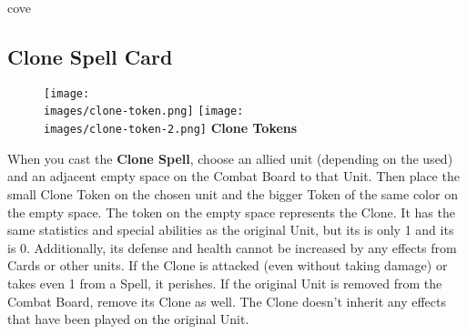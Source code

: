 \begin{multicols}{2}
\begin{expansion}{cove}
    \subsection*{Clone Spell Card}
    \setlength\intextsep{0pt}
    \setlength\columnsep{1em}
    \begin{wrapfigure}{r}{0.2\linewidth}
        \texttt{[image: \\images/clone-token.png]}\vspace*{1em}
        \texttt{[image: \\images/clone-token-2.png]}
        \centering\textbf{\scriptsize\color{darkcandyapplered}Clone \mbox{Tokens}\\}
    \end{wrapfigure}
    When you cast the \textbf{Clone Spell}, choose an allied unit (depending on the  used) and an adjacent empty space on the Combat Board to that Unit.
    Then place the small Clone Token on the chosen unit and the bigger Token of the same color on the empty space.
    The token on the empty space represents the Clone.
    It has the same statistics and special abilities as the original Unit, but its  is only 1 and its  is 0.
    Additionally, its defense and health cannot be increased by any effects from Cards or other units. %
    If the Clone is attacked (even without taking damage) or takes even 1  from a Spell, it perishes. %
    If the original Unit is removed from the Combat Board, remove its Clone as well.
    The Clone doesn't inherit any effects that have been played on the original Unit.
\end{expansion}
\end{multicols}

